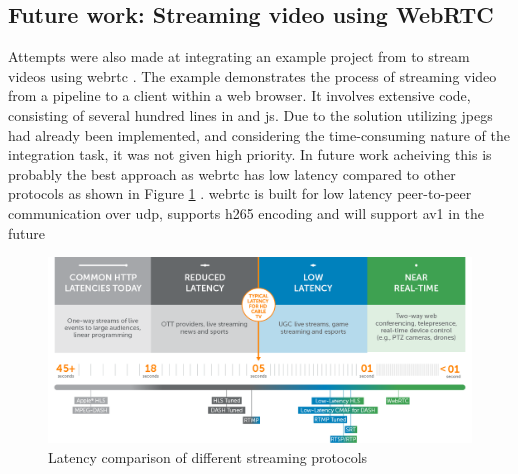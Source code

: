 \subsection{Future work: Streaming video using WebRTC}
Attempts were also made at integrating an example project from \gs  to stream videos using \gls{webrtc} \cite{gstreamerWebrtcMasterGStreamer2021}.
The example demonstrates the process of streaming video from a pipeline to a client within a web browser. It involves extensive code, consisting of several hundred lines in \py and \gls{js}.
Due to the solution utilizing \glspl{jpeg} had already been implemented, and considering the time-consuming nature of the integration task, it was not given high priority.
In future work acheiving this is probably the best approach as \gls{webrtc} has low latency compared to other protocols as shown in Figure \ref{fig:streaming_latency} \cite{doughertyUltraLowLatency2022}.
\gls{webrtc} is built for low latency peer-to-peer communication over \gls{udp}, supports \gls{h265} encoding and will support \gls{av1} in the future \cite[1]{loretoRealTimeCommunicationWebRTC2014} \cite{ablyWebRTCVsWebSocket2023} \cite{mekyaFirstHEVC2652020}
\cite{red5proKeyReasonsAV12023}
\begin{figure}[H]
    \centering
    \includegraphics[width=\textwidth]{figures/webrtc_latency.png}
    \caption{Latency comparison of different streaming protocols \cite{doughertyUltraLowLatency2022}}
    \label{fig:streaming_latency}
\end{figure}


